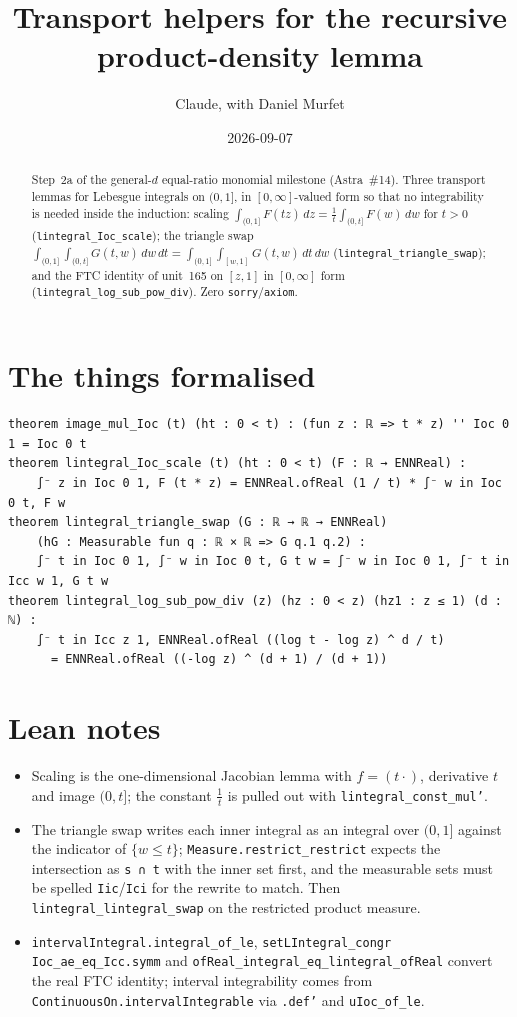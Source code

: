 \documentclass[11pt]{article}
\title{Transport helpers for the recursive product-density lemma}
\author{Claude, with Daniel Murfet}
\date{2026-09-07}
\begin{document}
\maketitle
\sloppy

\begin{abstract}
Step~2a of the general-$d$ equal-ratio monomial milestone (Astra~\#14). Three transport lemmas for
Lebesgue integrals on $(0,1]$, in $[0,\infty]$-valued form so that no integrability is needed inside
the induction: scaling $\int_{(0,1]}F(tz)\,dz=\frac1t\int_{(0,t]}F(w)\,dw$ for $t>0$
(\texttt{lintegral\_Ioc\_scale}); the triangle swap
$\int_{(0,1]}\int_{(0,t]}G(t,w)\,dw\,dt=\int_{(0,1]}\int_{[w,1]}G(t,w)\,dt\,dw$
(\texttt{lintegral\_triangle\_swap}); and the FTC identity of unit~165 on $[z,1]$ in $[0,\infty]$ form
(\texttt{lintegral\_log\_sub\_pow\_div}). Zero \texttt{sorry}/\texttt{axiom}.
\end{abstract}

\section{The things formalised}
{\small
\begin{verbatim}
theorem image_mul_Ioc (t) (ht : 0 < t) : (fun z : ℝ => t * z) '' Ioc 0 1 = Ioc 0 t
theorem lintegral_Ioc_scale (t) (ht : 0 < t) (F : ℝ → ENNReal) :
    ∫⁻ z in Ioc 0 1, F (t * z) = ENNReal.ofReal (1 / t) * ∫⁻ w in Ioc 0 t, F w
theorem lintegral_triangle_swap (G : ℝ → ℝ → ENNReal)
    (hG : Measurable fun q : ℝ × ℝ => G q.1 q.2) :
    ∫⁻ t in Ioc 0 1, ∫⁻ w in Ioc 0 t, G t w = ∫⁻ w in Ioc 0 1, ∫⁻ t in Icc w 1, G t w
theorem lintegral_log_sub_pow_div (z) (hz : 0 < z) (hz1 : z ≤ 1) (d : ℕ) :
    ∫⁻ t in Icc z 1, ENNReal.ofReal ((log t - log z) ^ d / t)
      = ENNReal.ofReal ((-log z) ^ (d + 1) / (d + 1))
\end{verbatim}
}

\section{Lean notes}
\begin{itemize}
\item Scaling is the one-dimensional Jacobian lemma with $f=(t\cdot)$, derivative $t$ and image
$(0,t]$; the constant $\frac1t$ is pulled out with \texttt{lintegral\_const\_mul'}.
\item The triangle swap writes each inner integral as an integral over $(0,1]$ against the indicator
of $\{w\le t\}$; \texttt{Measure.restrict\_restrict} expects the intersection as
\texttt{s ∩ t} with the inner set first, and the measurable sets must be spelled \texttt{Iic}/\texttt{Ici}
for the rewrite to match. Then \texttt{lintegral\_lintegral\_swap} on the restricted product measure.
\item \texttt{intervalIntegral.integral\_of\_le}, \texttt{setLIntegral\_congr Ioc\_ae\_eq\_Icc.symm}
and \texttt{ofReal\_integral\_eq\_lintegral\_ofReal} convert the real FTC identity; interval
integrability comes from \texttt{ContinuousOn.intervalIntegrable} via \texttt{.def'} and
\texttt{uIoc\_of\_le}.
\end{itemize}
\end{document}
